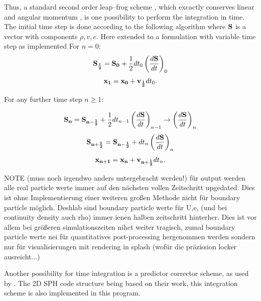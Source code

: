 \documentclass{report}
\begin{document}
Thus, a standard second order leap--frog scheme %
, which excactly conserves linear and angular momentum
, is one possibility to perform the integration in
time. The initial time step is done according to the following algorithm where
${\bf S}$ is a vector with components  $\rho,v,e$.
Here extended to a formulation with variable time step as implemented
\linebreak[2]
For $n=0$:
\begin{equation}
{\bf S_{\frac{1}{2}}}={\bf S_0}+\frac{1}{2}dt_0\left(\frac{d{\bf S}}{dt}\right)_0
\end{equation}
\begin{equation}
{\bf x_1}={\bf x_0}+{\bf v_{\frac{1}{2}}}dt_0 .
\end{equation}

For any further time step $n\ge1$:

\begin{equation}
{\bf S_n}={\bf S_{n-\frac{1}{2}}}+\frac{1}{2}dt_{n-1}\left(\frac{d{\bf S}}{dt}\right)_{n-1} \rightarrow
\left(\frac{d{\bf S}}{dt}\right)_n 
\end{equation}
\begin{equation}
{\bf S_{n+\frac{1}{2}}}={\bf S_{n-\frac{1}{2}}}+dt_n\left(\frac{d{\bf S}}{dt}\right)_n 
\end{equation}
\begin{equation}
{\bf x_{n+1}}={\bf x_n}+{\bf v_{n+\frac{1}{2}}}dt_n .
\end{equation}

NOTE (muss noch irgendwo anders untergebracht werden!) für output werden alle real particle werte immer auf den nächsten vollen Zeitschritt upgedated. Dies ist ohne Implementierung einer weiteren großen Methode nicht für boundary particle möglich. Deshlab sind boundary particle werte für U,e, (und bei continuity density auch rho) immer ienen halben zeitschritt hinterher. Dies ist vor allem bei größeren simulationszeiten nihct weiter tragisch, zumal boundary particle werte nei für quantitatives post-processing hergenommen werden sondern nur für visualisierungen mit rendering in splash (wofür die präzission locker ausreicht...)

Another possibility for time integration is a predictor corrector scheme, as
used by \cite{Hu2007}.
The 2D SPH code structure being based on their work,
this integration scheme is also implemented in this program.
\end{document}
